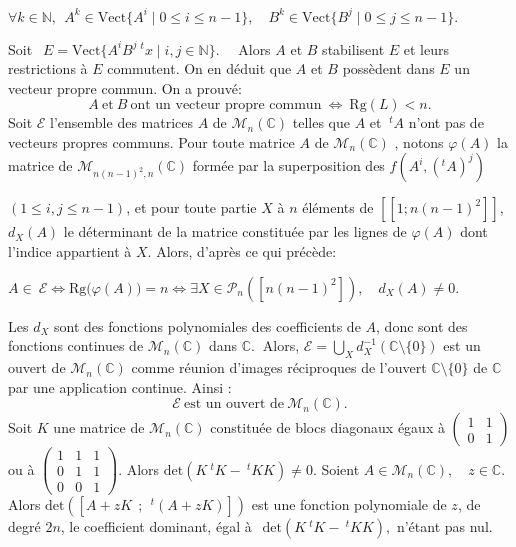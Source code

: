  $\forall k \in \mathbb N,\:\: A^k \in \text{Vect}\{A^{i} \mid 0\leqslant i \leqslant n-1\}, \quad B^k \in \text{Vect}\{ B^j \mid 0 \leqslant j \leqslant n-1\}.$ 
   
  Soit $\:\:E= \text{Vect} \Big\{ A^{i}B^j\:^tx \mid i,j \in \mathbb N\Big \}.\quad$ Alors $A$ et $B$ stabilisent $E$ et leurs restrictions à $E$ commutent. On en déduit que $A$ et $B$ possèdent dans $E$ un vecteur propre commun. On a prouvé:
   $$ \boxed{A \:\text{et}\: B\:\text{ont un vecteur propre commun}\: \iff\: \text{Rg}(L) <n.}$$ 
 Soit $\mathcal E$ l'ensemble des matrices $A$  de $\mathcal M_n (\mathbb C)$  telles que $A$ et $\:^t\!A$ n'ont pas de vecteurs propres communs. 
Pour toute matrice $A$ de $\mathcal M_n(\mathbb C)$ , notons $\varphi(A)$ la matrice de $\mathcal M_{n(n-1)^2, n} (\mathbb C)$  formée par la superposition des $f(A^{i},(^tA)^j)$

$( 1\leqslant i, j \leqslant n-1 )$,   et pour toute partie $X$ à $n$ éléments de $[\![1;n(n-1)^2] \!]$, $d_X(A)$ le déterminant de la matrice constituée par les lignes de $\varphi(A)$ dont l'indice appartient à $X$.  Alors, d'après ce qui précède:
  
  $A \in \: \mathcal E \iff \text{Rg}\Big(\varphi (A)\Big ) =n\iff \exists X \in \mathcal P_n([n(n-1)^2]), \quad d_X(A) \neq 0.$ 
  
  Les $d_X$ sont des fonctions polynomiales des coefficients de $A$, donc sont des fonctions continues de $\mathcal M_n(\mathbb C)$  dans $\mathbb C.\:$ Alors, $\mathcal E = \displaystyle \bigcup _{X} d_X^{-1} (\mathbb C \setminus\{0\}) $  est un ouvert de $\mathcal M_n(\mathbb C)$ comme réunion d'images réciproques de l'ouvert $\mathbb C \setminus\{0\}$ de $\mathbb C$ par une application continue. Ainsi : $$\boxed {\mathcal E \: \text{est un ouvert de} \: \mathcal M_n(\mathbb C).}$$  
  Soit $K$ une matrice de $\mathcal M_n(\mathbb C)$ constituée de blocs diagonaux égaux à $\begin {pmatrix} 1&1\\0&1 \end{pmatrix}$ ou à $\begin{pmatrix} 1&1&1\\0&1&1\\0&0&1 \end{pmatrix}$.  Alors $\text{det}(K\:^t\!K - \:^t\!KK) \neq 0.$ 
  Soient $A \in \mathcal M_n(\mathbb C) , \quad z\in \mathbb C.\:\:$ Alors  $\text{det} \left( [A+zK\:\:; \:\:^t\!(A+zK)] \right )$ est une fonction polynomiale de $z$, de degré  $2n$, le coefficient dominant, égal à $\:\:\text{det}(K\:^t\!K - \:^t\!KK) ,$  n'étant pas nul.
  
